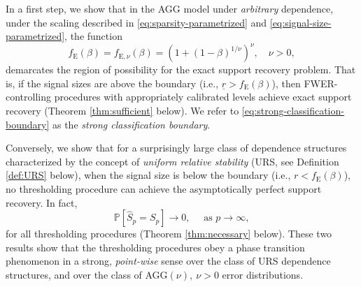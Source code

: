 In a first step, we show that in the AGG model under \emph{arbitrary} dependence, under the scaling described in \eqref{eq:sparsity-parametrized} and \eqref{eq:signal-size-parametrized}, the function
\begin{equation} \label{eq:strong-classification-boundary}
    f_{\mathrm{E}}(\beta) = f_{\mathrm{E},\nu}(\beta) = (1 + (1 - \beta)^{1/\nu})^\nu, \quad \nu>0,
\end{equation}
demarcates the region of possibility for the exact support recovery problem.
That is, if the signal sizes are above the boundary (i.e., $\underline{r}> f_{\mathrm{E}}(\beta)$), then \ac{FWER}-controlling procedures with appropriately calibrated levels achieve exact support recovery (Theorem \ref{thm:sufficient} below).
We refer to \eqref{eq:strong-classification-boundary} as the {\em strong classification boundary}.

Conversely, we show that for a surprisingly large class of dependence structures characterized by the concept of \emph{uniform relative stability} (URS, see Definition \ref{def:URS} below), when the signal size is below the boundary  (i.e., $r<f_{\mathrm{E}}(\beta)$), no thresholding procedure can achieve the asymptotically perfect support recovery. In fact,
\begin{equation} \label{eq:exact-recovery-failure}
    \mathbb{P}\left[\widehat{S}_p=S_p\right]\longrightarrow 0,\quad \mbox{ as }p\to \infty,
\end{equation}
for all thresholding procedures (Theorem \ref{thm:necessary} below).
These two results show that the thresholding procedures obey a phase transition phenomenon in a strong, \emph{point-wise} sense over the class of URS dependence structures, and over the class of AGG$(\nu),\ \nu>0$ error distributions. 




